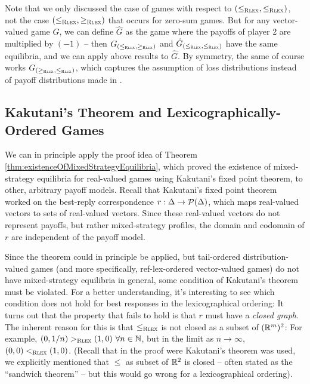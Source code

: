 \documentclass[a4paper]{scrreprt}
\begin{document}
    Note that we only discussed the case of games with respect to ${(\leq_{\textsc{Rlex}},\leq_{\textsc{Rlex}})}$, not the case ${(\leq_{\textsc{Rlex}},\geq_{\textsc{Rlex}})}$ that occurs for zero-sum games.
    But for any vector-valued game $G$, we can define $\hat{G}$ as the game where the payoffs of player 2 are multiplied by $(-1)$ -- then $G_{{(\leq_{\textsc{Rlex}},\geq_{\textsc{Rlex}})}}$ and $\hat{G}_{{(\leq_{\textsc{Rlex}},\leq_{\textsc{Rlex}})}}$ have the same equilibria, and we can apply above results to $\hat{G}$.
    By symmetry, the same of course works $G_{{(\geq_{\textsc{Rlex}},\leq_{\textsc{Rlex}})}}$, which captures the assumption of loss distributions instead of payoff distributions made in \cite{bib:rassGameRiskManagI}.
    
    
    
    \subsection{Kakutani's Theorem and Lexicographically-Ordered Games}
    We can in principle apply the proof idea of Theorem \ref{thm:existenceOfMixedStrategyEquilibria}, which proved the existence of mixed-strategy equilibria for real-valued games using Kakutani's fixed point theorem, to other, arbitrary payoff models. Recall that Kakutani's fixed point theorem worked on the best-reply correspondence $r: \Delta \to \operatorname{\mathcal{P}}(\Delta)$, which maps real-valued vectors to sets of real-valued vectors. Since these real-valued vectors do not represent payoffs, but rather mixed-strategy profiles, the domain and codomain of $r$ are independent of the payoff model.
    
    Since the theorem could in principle be applied, but tail-ordered distribution-valued games (and more specifically, ref-lex-ordered vector-valued games) do not have mixed-strategy equilibria in general, some condition of Kakutani's theorem must be violated. For a better understanding, it's interesting to see which condition does not hold for best responses in the lexicographical ordering:
    It turns out that the property that fails to hold is that $r$ must have a \emph{closed graph}.
    The inherent reason for this is that $\leq_{\textsc{Rlex}}$ is not closed as a subset of $(\mathbb{R}^m)^2$:
    For example, $(0, 1/n) >_{\textsc{Rlex}} (1, 0) ~ \forall n \in \mathbb{N}$, but in the limit as $n \to \infty$, $(0, 0) <_{\textsc{Rlex}} (1, 0)$.
    (Recall that in the proof were Kakutani's theorem was used, we explicitly mentioned that $\leq$ as subset of $\mathbb{R}^2$ is closed -- often stated as the “sandwich theorem” -- but this would go wrong for a lexicographical ordering).
    
\end{document}
